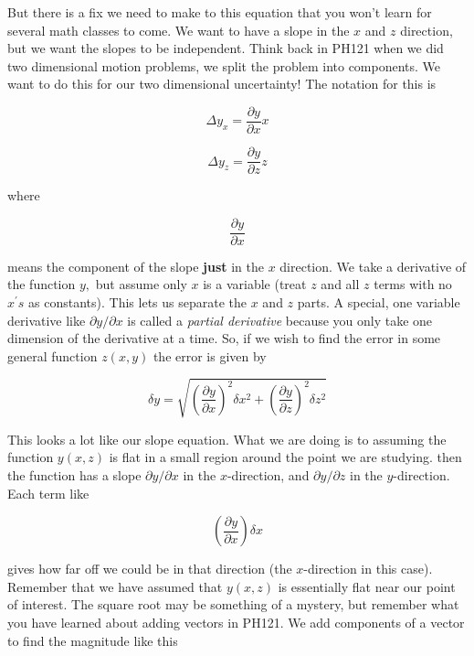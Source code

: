But there is a fix we need to make to this equation that you won't learn for several math classes to come. We want to have a slope in the $x$ and $z$ direction, but we want the slopes to be independent. Think back in PH121 when we did two dimensional motion problems, we split the problem into components. We want to do this for our two dimensional uncertainty! The notation for this is

\begin{equation*}
	\Delta y_{x}=\frac{\partial y}{\partial x}x
\end{equation*}

\begin{equation*}
	\Delta y_{z}=\frac{\partial y}{\partial z}z
\end{equation*}

where 

\begin{equation*}
	\frac{\partial y}{\partial x}
\end{equation*}

means the component of the slope \textbf{just} in the $x$ direction. We take a derivative of the function $y,$ but assume only $x$ is a variable (treat $z$ and all $z$ terms with no $x^{\prime }s$ as constants). This lets us separate the $x$ and $z$ parts. A special, one variable derivative like $\partial y/\partial x$ is called a \emph{partial derivative} because you only take one dimension of the derivative at a time. So, if we wish to find the error in some general function $z\left( x,y\right) $ the error is given by
 
\begin{equation*}
	\delta y=\sqrt{\left( \frac{\partial y}{\partial x}\right) ^{2}\delta x^{2}+\left( \frac{\partial y}{\partial z}\right) ^{2}\delta z^{2}}
\end{equation*}

This looks a lot like our slope equation. What we are doing is to assuming the function $y\left( x,z\right) $ is flat in a small region around the point we are studying. then the function has a slope $\partial y/\partial x$ in the $x$-direction, and $\partial y/\partial z$ in the $y$-direction. Each term like 

\begin{equation*}
	\left( \frac{\partial y}{\partial x}\right) \delta x
\end{equation*}

gives how far off we could be in that direction (the $x$-direction in this case). Remember that we have assumed that $y\left( x,z\right) $ is essentially flat near our point of interest. The square root may be something of a mystery, but remember what you have learned about adding vectors in PH121. We add components of a vector to find the magnitude like this
 
